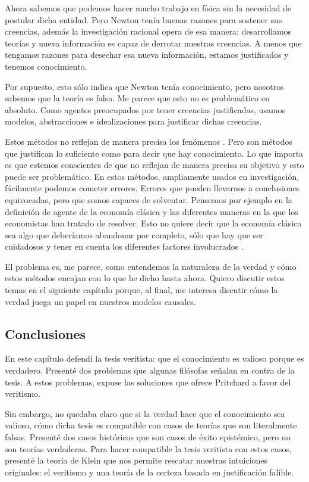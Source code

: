 Ahora sabemos que podemos hacer mucho trabajo en física sin la necesidad de postular dicha entidad. 
Pero Newton tenía buenas razones para sostener sus creencias, además la investigación racional opera de esa manera: desarrollamos teorías y nueva información es capaz de derrotar nuestras creencias. 
A menos que tengamos razones para desechar esa nueva información, estamos justificados y tenemos conocimiento.

Por supuesto, esto sólo indica que Newton tenía conocimiento, pero nosotros sabemos que la teoría es falsa.
Me parece que esto no es problemático en absoluto.
Como agentes preocupados por tener creencias justificadas, usamos modelos, abstracciones e idealizaciones para justificar dichas creencias.

Estos métodos no reflejan de manera precisa los fenómenos \parencite{bokulich2016}.
Pero son métodos que justifican lo suficiente como para decir que hay conocimiento.
Lo que importa es que estemos conscientes de que no reflejan de manera precisa su objetivo y esto puede ser problemático.
En estos métodos, ampliamente usados en investigación, fácilmente podemos cometer errores.
Errores que pueden llevarnos a conclusiones equivocadas, pero que somos capaces de solventar.
Pensemos por ejemplo en la definición de agente de la economía clásica y las diferentes maneras en la que los economistas han tratado de resolver.
Esto no quiere decir que la economía clásica sea algo que deberíamos abandonar por completo, sólo que hay que ser cuidadosos y tener en cuenta los diferentes factores involucrados \parencite{sen1977}.

El problema es, me parece, como entendemos la naturaleza de la verdad y cómo estos métodos encajan con lo que he dicho hasta ahora.
Quiero discutir estos temas en el siguiente capítulo porque, al final, me interesa discutir cómo la verdad juega un papel en nuestros modelos causales.

\subsection{Conclusiones}

En este capítulo defendí la tesis veritista: que el conocimiento es valioso porque es verdadero.
Presenté dos problemas que algunas filósofas señalan en contra de la tesis.
A estos problemas, expuse las soluciones que ofrece Pritchard a favor del veritismo. 

Sin embargo, no quedaba claro que si la verdad hace que el conocimiento sea valioso, cómo dicha tesis es compatible con casos de teorías que son literalmente falsas.
Presenté dos casos históricos que son casos de éxito epistémico, pero no son teorías verdaderas. 
Para hacer compatible la tesis veritista con estos casos, presenté la teoría de Klein que nos permite rescatar nuestras intuiciones originales: el veritismo y una teoría de la certeza basada en justificación falible.

